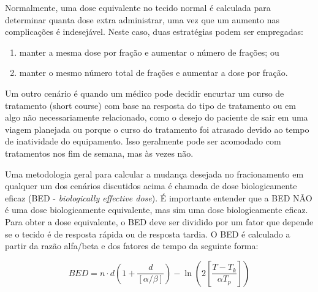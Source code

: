 \documentclass[11pt,a4paper]{article}
\begin{document}
	Normalmente, uma dose equivalente no tecido normal é calculada para determinar quanta dose extra administrar, uma vez que um aumento nas complicações é indesejável. Neste caso, duas estratégias podem ser empregadas:

	\begin{enumerate}[label=\textcolor{CarnationPink}{(\roman*)}]
		\item manter a mesma dose por fração e aumentar o número de frações; ou
		\item manter o mesmo número total de frações e aumentar a dose por fração.
	\end{enumerate}

	Um outro cenário é quando um médico pode decidir encurtar um curso de tratamento (short course) com base na resposta do tipo de tratamento ou em algo não necessariamente relacionado, como o desejo do paciente de sair em uma viagem planejada ou porque o curso do tratamento foi atrasado devido ao tempo de inatividade do equipamento. Isso geralmente pode ser acomodado com tratamentos nos fim de semana, mas às vezes não.

	Uma metodologia geral para calcular a mudança desejada no fracionamento em qualquer um dos cenários discutidos acima é chamada de dose biologicamente eficaz (BED - \textit{biologically effective dose}). É importante entender que a BED NÃO é uma dose biologicamente equivalente, mas sim uma dose biologicamente eficaz. Para obter a dose equivalente, o BED deve ser dividido por um fator que depende se o tecido é de resposta rápida ou de resposta tardia. %
	O BED é calculado a partir da razão alfa/beta e dos fatores de tempo da seguinte forma:

	\begin{equation}
		BED = n \cdot d \left(1 + \frac{d}{[\alpha / \beta]}\right) - \ln \left(2 \left[\frac{T - T_k}{\alpha T_p}\right]\right)
	\end{equation}
\end{document}
